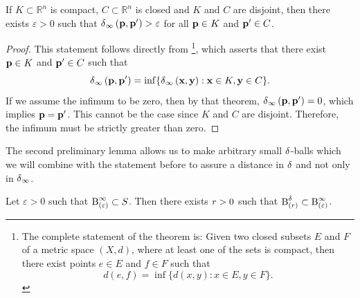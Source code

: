 \begin{lem} \label{lemma-distance}
	If $K \subset \mathbb{R}^{n}$ is compact, $C \subset \mathbb{R}^{n}$ is closed and $K$ and $C$ are disjoint, then there exists $\varepsilon > 0$ such that $\metr[\infty]{\ve{p}}{\ve{p}'} > \varepsilon$ for all $\ve{p} \in K$ and $\ve{p'} \in C$.
\end{lem}

\begin{proof}
  This statement follows directly from \textcite[p. 886, Exercise 13.12.10]{elementaryAna}\footnote{The complete statement of the theorem is: Given two closed subsets $E$ and $F$ of a metric space $(X, d)$, where at least one of the sets is compact, then there exist points $e \in E$ and $f \in F$ such that $$d(e,f) = \inf \{d(x,y): x \in E, y \in F\}.$$}, which asserts that there exist $\ve{p} \in K$ and $\ve{p}' \in C$ such that
  $$
  \metr[\infty]{\ve{p}}{\ve{p}'} = \inf \{\metr[\infty]{\ve{x}}{\ve{y}}: \ve{x} \in K, \ve{y} \in C\}.
  $$
  If we assume the infimum to be zero, then by that theorem, $\metr[\infty]{\ve{p}}{\ve{p}'} = 0$, which implies $\ve{p} = \ve{p}'$. This cannot be the case since $K$ and $C$ are disjoint.
  Therefore, the infimum must be strictly greater than zero.
\end{proof}

The second preliminary lemma allows us to make arbitrary small $\metric$-balls which we will combine with the statement before to assure a distance in $\metric$ and not only in $\metric_{\infty}$.

\begin{lem} \label{lemma-small-delta-balls}
	Let $\varepsilon > 0$ such that $\ball[\infty]{\varepsilon} \subset S$. Then there exists $\dis > 0$ such that $\ball{\dis} \subset \ball[\infty]{\varepsilon}$.
\end{lem}

